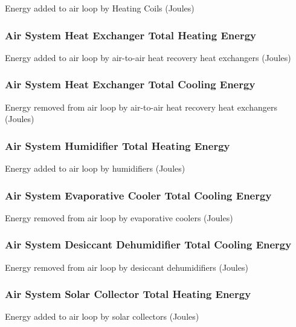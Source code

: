 Energy added to air loop by Heating Coils (Joules)

\subsubsection{Air System Heat Exchanger Total Heating Energy}\label{air-system-heat-exchanger-total-heating-energy}

Energy added to air loop by air-to-air heat recovery heat exchangers (Joules)

\subsubsection{Air System Heat Exchanger Total Cooling Energy}\label{air-system-heat-exchanger-total-cooling-energy}

Energy removed from air loop by air-to-air heat recovery heat exchangers (Joules)

\subsubsection{Air System Humidifier Total Heating Energy}\label{air-system-humidifier-total-heating-energy}

Energy added to air loop by humidifiers (Joules)

\subsubsection{Air System Evaporative Cooler Total Cooling Energy}\label{air-system-evaporative-cooler-total-cooling-energy}

Energy removed from air loop by evaporative coolers (Joules)

\subsubsection{Air System Desiccant Dehumidifier Total Cooling Energy}\label{air-system-desiccant-dehumidifier-total-cooling-energy}

Energy removed from air loop by desiccant dehumidifiers (Joules)

\subsubsection{Air System Solar Collector Total Heating Energy}\label{air-system-solar-collector-total-heating-energy}

Energy added to air loop by solar collectors (Joules)

